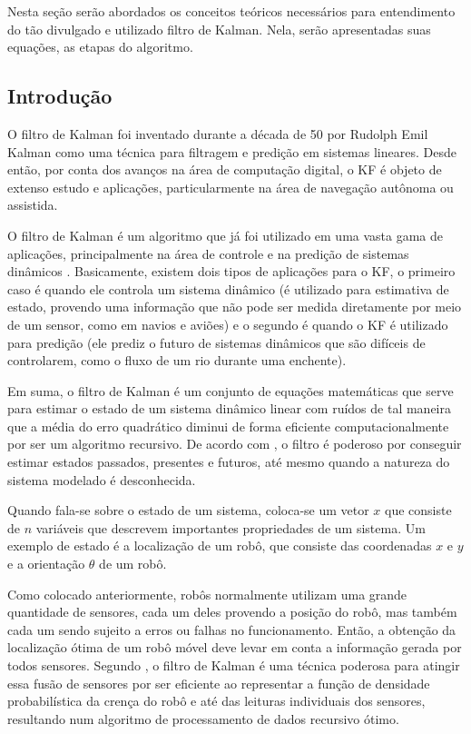 \documentclass[acronym, symbols]{fei}
\begin{document}
		Nesta seção serão abordados os conceitos teóricos necessários para entendimento do tão divulgado e utilizado filtro de Kalman. Nela, serão apresentadas suas equações, as etapas do algoritmo.
		
		\subsection{Introdução}
		
			O filtro de Kalman foi inventado durante a década de 50 por Rudolph Emil Kalman como uma técnica para filtragem e predição em sistemas lineares. Desde então, por conta dos avanços na área de computação digital, o KF é objeto de extenso estudo e aplicações, particularmente na área de navegação autônoma ou assistida.
			
			O filtro de Kalman é um algoritmo que já foi utilizado em uma vasta gama de aplicações, principalmente na área de controle e na predição de sistemas dinâmicos \cite{phdthesisNegenborn}. Basicamente, existem dois tipos de aplicações para o KF, o primeiro caso é quando ele controla um sistema dinâmico (é utilizado para estimativa de estado, provendo uma informação que não pode ser medida diretamente por meio de um sensor, como em navios e aviões) e o segundo é quando o KF é utilizado para predição (ele prediz o futuro de sistemas dinâmicos que são difíceis de controlarem, como o fluxo de um rio durante uma enchente).
			
			Em suma, o filtro de Kalman é um conjunto de equações matemáticas que serve para estimar o estado de um sistema dinâmico linear com ruídos de tal maneira que a média do erro quadrático diminui de forma eficiente computacionalmente por ser um algoritmo recursivo. De acordo com \textcite{welch1995introduction}, o filtro é poderoso por conseguir estimar estados passados, presentes e futuros, até mesmo quando a natureza do sistema modelado é desconhecida.
			
			Quando fala-se sobre o estado de um sistema, coloca-se um vetor $x$ que consiste de $n$ variáveis que descrevem importantes propriedades de um sistema. Um exemplo de estado é a localização de um robô, que consiste das coordenadas $x$ e $y$ e a orientação $\theta$ de um robô.
			
			Como colocado anteriormente, robôs normalmente utilizam uma grande quantidade de sensores, cada um deles provendo a posição do robô, mas também cada um sendo sujeito a erros ou falhas no funcionamento. Então, a obtenção da localização ótima de um robô móvel deve levar em conta a informação gerada por todos sensores. Segundo \textcite{siegwart2011introduction}, o filtro de Kalman é uma técnica poderosa para atingir essa fusão de sensores por ser eficiente ao representar a função de densidade probabilística da crença do robô e até das leituras individuais dos sensores, resultando num algoritmo de processamento de dados recursivo ótimo.
			
\end{document}
